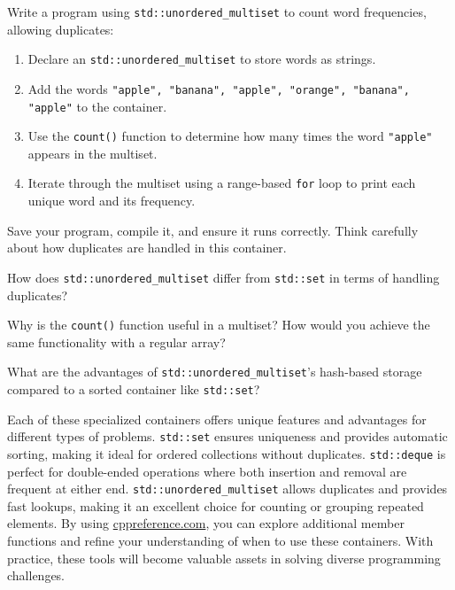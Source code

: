 \begin{challenge}
    \begin{task}
        Write a program using \texttt{std::unordered\_multiset} to count word frequencies, allowing duplicates:
        \begin{enumerate}
            \item Declare an \texttt{std::unordered\_multiset} to store words as strings.
            \item Add the words \texttt{"apple", "banana", "apple", "orange", "banana", "apple"} to the container.
            \item Use the \texttt{count()} function to determine how many times the word \texttt{"apple"} appears in the multiset.
            \item Iterate through the multiset using a range-based \texttt{for} loop to print each unique word and its frequency.
        \end{enumerate}

        Save your program, compile it, and ensure it runs correctly. Think carefully about how duplicates are handled in this container.

        \begin{questions}
            \item How does \texttt{std::unordered\_multiset} differ from \texttt{std::set} in terms of handling duplicates?
            \item Why is the \texttt{count()} function useful in a multiset? How would you achieve the same functionality with a regular array?
            \item What are the advantages of \texttt{std::unordered\_multiset}'s hash-based storage compared to a sorted container like \texttt{std::set}?
        \end{questions}
    \end{task}

    \begin{advice}
        Each of these specialized containers offers unique features and advantages for different types of problems. 
        \texttt{std::set} ensures uniqueness and provides automatic sorting, making it ideal for ordered collections without duplicates. 
        \texttt{std::deque} is perfect for double-ended operations where both insertion and removal are frequent at either end. 
        \texttt{std::unordered\_multiset} allows duplicates and provides fast lookups, making it an excellent choice for counting or grouping repeated elements. 
        By using \href{https://en.cppreference.com/}{cppreference.com}, you can explore additional member functions and refine your understanding of when to use these containers. 
        With practice, these tools will become valuable assets in solving diverse programming challenges.
    \end{advice}
\end{challenge}
